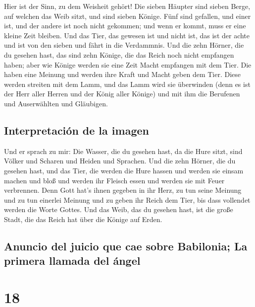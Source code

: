  Hier ist der Sinn, zu dem Weisheit gehört! Die sieben
Häupter sind sieben Berge, auf welchen das Weib sitzt, und sind sieben
Könige.  Fünf sind gefallen, und einer ist, und der
andere ist noch nicht gekommen; und wenn er kommt, muss er eine kleine
Zeit bleiben.  Und das Tier, das gewesen ist und nicht
ist, das ist der achte und ist von den sieben und fährt in die
Verdammnis.  Und die zehn Hörner, die du gesehen hast,
das sind zehn Könige, die das Reich noch nicht empfangen haben; aber wie
Könige werden sie eine Zeit Macht empfangen mit dem Tier.
 Die haben eine Meinung und werden ihre Kraft und Macht
geben dem Tier.  Diese werden streiten mit dem Lamm, und
das Lamm wird sie überwinden (denn es ist der Herr aller Herren und der
König aller Könige) und mit ihm die Berufenen und Auserwählten und
Gläubigen.

\hypertarget{interpretaciuxf3n-de-la-imagen}{%
\subsection{Interpretación de la
imagen}\label{interpretaciuxf3n-de-la-imagen}}

 Und er sprach zu mir: Die Wasser, die du gesehen hast,
da die Hure sitzt, sind Völker und Scharen und Heiden und Sprachen.
 Und die zehn Hörner, die du gesehen hast, und das Tier,
die werden die Hure hassen und werden sie einsam machen und bloß und
werden ihr Fleisch essen und werden sie mit Feuer verbrennen.
 Denn Gott hat's ihnen gegeben in ihr Herz, zu tun seine
Meinung und zu tun einerlei Meinung und zu geben ihr Reich dem Tier, bis
dass vollendet werden die Worte Gottes.  Und das Weib,
das du gesehen hast, ist die große Stadt, die das Reich hat über die
Könige auf Erden.

\hypertarget{anuncio-del-juicio-que-cae-sobre-babilonia-la-primera-llamada-del-uxe1ngel}{%
\subsection{Anuncio del juicio que cae sobre Babilonia; La primera
llamada del
ángel}\label{anuncio-del-juicio-que-cae-sobre-babilonia-la-primera-llamada-del-uxe1ngel}}

\hypertarget{section-17}{%
\section{18}\label{section-17}}

